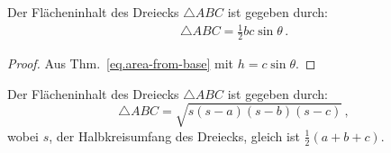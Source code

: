 \begin{theorem} Der Flächeninhalt des Dreiecks $\triangle ABC$ ist gegeben durch:
\begin{align}\label{eq.area-from-sine}
\triangle ABC = \frac{1}{2}bc\sin \theta\,.
\end{align}
\end{theorem}
\begin{proof} Aus Thm.~\ref{eq.area-from-base} mit
$h=c\sin \theta$.
\end{proof}



\begin{theorem}[Heron] Der Flächeninhalt des Dreiecks $\triangle ABC$ ist gegeben durch:\label{thm.heron} 
\[
\triangle ABC = \sqrt{s(s-a)(s-b)(s-c)}\,,
\]
wobei $s$, der Halbkreisumfang des Dreiecks, gleich ist $\frac{1}{2}(a+b+c)$.
\end{theorem}

